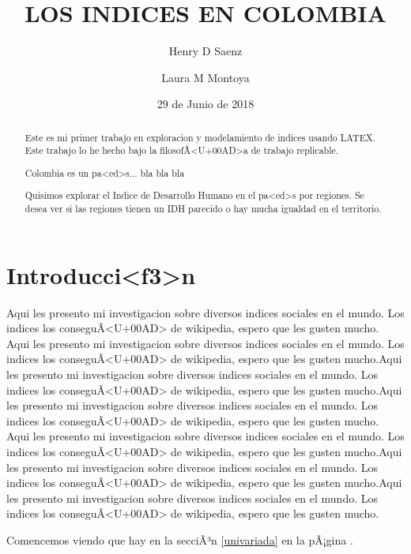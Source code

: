 \documentclass{article}
\title{LOS INDICES EN COLOMBIA}
\author[1]{\normalsize Henry D Saenz}
\author[2]{\normalsize Laura M Montoya}
\affil[1,2]{\small  Universidad de los Andes\\
\texttt{{hd.saenz10,lm.montoya10}@uniandes.edu.col}}
\affil[1,2]{\small Ecole des Mines de Nantes\\
\texttt{{hsaenz16,lmontoya16}@imt-atlantique.fr}}
\date{29 de Junio de 2018}
\begin{document}


\maketitle


\begin{abstract}
Este es mi primer trabajo en exploracion y modelamiento de indices usando LATEX. Este trabajo lo he hecho bajo la filosofÃ<U+00AD>a de trabajo replicable. 

Colombia es un pa<ed>s... bla bla bla

Quisimos explorar el Indice de Desarrollo Humano en el pa<ed>s por regiones. Se desea ver si las regiones tienen un IDH parecido o hay mucha igualdad en el territorio. 
\end{abstract}

\section*{Introducci<f3>n}

Aqui les presento mi investigacion sobre diversos indices sociales en el mundo. Los indices los conseguÃ<U+00AD> de wikipedia, espero que les gusten mucho. Aqui les presento mi investigacion sobre diversos indices sociales en el mundo. Los indices los conseguÃ<U+00AD> de wikipedia, espero que les gusten mucho.Aqui les presento mi investigacion sobre diversos indices sociales en el mundo. Los indices los conseguÃ<U+00AD> de wikipedia, espero que les gusten mucho.Aqui les presento mi investigacion sobre diversos indices sociales en el mundo. Los indices los conseguÃ<U+00AD> de wikipedia, espero que les gusten mucho.
Aqui les presento mi investigacion sobre diversos indices sociales en el mundo. Los indices los conseguÃ<U+00AD> de wikipedia, espero que les gusten mucho.Aqui les presento mi investigacion sobre diversos indices sociales en el mundo. Los indices los conseguÃ<U+00AD> de wikipedia, espero que les gusten mucho.Aqui les presento mi investigacion sobre diversos indices sociales en el mundo. Los indices los conseguÃ<U+00AD> de wikipedia, espero que les gusten mucho.

Comencemos viendo que hay en la secciÃ³n \ref{univariada} en la pÃ¡gina \pageref{univariada}.

\clearpage




%



\renewcommand{\refname}{Bibliografia}

\end{document}
